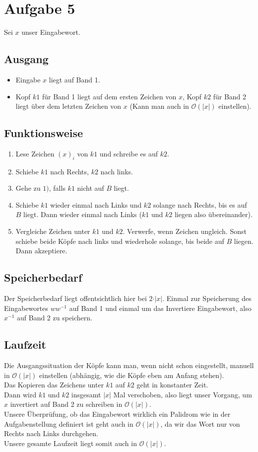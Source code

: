 \documentclass[a4paper,11pt]{scrartcl}
\begin{document}
	
	\section*{Aufgabe 5}
	Sei $x$ unser Eingabewort.
	\subsection*{Ausgang}
		\begin{itemize}
		\item Eingabe $x$ liegt auf Band 1.
		\item Kopf $k1$ für Band 1 liegt auf dem ersten Zeichen von $x$, Kopf $k2$ für Band 2 liegt über dem letzten Zeichen von $x$ (Kann man auch in $\mathcal{O} (\vert x \vert )$ einstellen).
		\end{itemize}
	\subsection*{Funktionsweise}
		\begin{enumerate}
		\item Lese Zeichen $(x)_i$ von $k1$ und schreibe es auf $k2$.
		\item Schiebe $k1$ nach Rechts, $k2$ nach links.
		\item Gehe zu $1)$, falls $k1$ nicht auf $B$ liegt.
		\item Schiebe $k1$ wieder einmal nach Links und $k2$ solange nach Rechts, bis es auf $B$ liegt. Dann wieder einmal nach Links ($k1$ und $k2$ liegen also übereinander).
		\item Vergleiche Zeichen unter $k1$ und $k2$. Verwerfe, wenn Zeichen ungleich. Sonst schiebe beide Köpfe nach links und wiederhole solange, bis beide auf $B$ liegen. Dann akzeptiere.
		\end{enumerate}
	\subsection*{Speicherbedarf}
		Der Speicherbedarf liegt offentsichtlich hier bei $2\cdot \vert x \vert$. Einmal zur Speicherung des Eingabewortes $ ww^{-1}$ auf Band 1 und einmal um das Invertiere Eingabewort, also $x^{-1}$ auf Band 2 zu speichern.
	\subsection*{Laufzeit}
		Die Ausgangssituation der Köpfe kann man, wenn nicht schon eingestellt, manuell in $\mathcal{O} (\vert x \vert )$ einstellen (abhängig, wie die Köpfe eben am Anfang stehen). \\
		Das Kopieren das Zeichens unter $k1$ auf $k2$ geht in konstanter Zeit. \\
		Dann wird $k1$ und $k2$ insgesamt $\vert x \vert$ Mal verschoben, also liegt unser Vorgang, um $x$ invertiert auf Band 2 zu schreiben in $\mathcal{O} (\vert x \vert )$. \\
		Unsere Überprüfung, ob das Eingabewort wirklich ein Palidrom wie in der Aufgabenstellung definiert ist geht auch in $\mathcal{O} (\vert x \vert )$, da wir das Wort nur von Rechts nach Links durchgehen.\\
		Unsere gesamte Laufzeit liegt somit auch in $\mathcal{O} (\vert x \vert )$.
	
\end{document}
